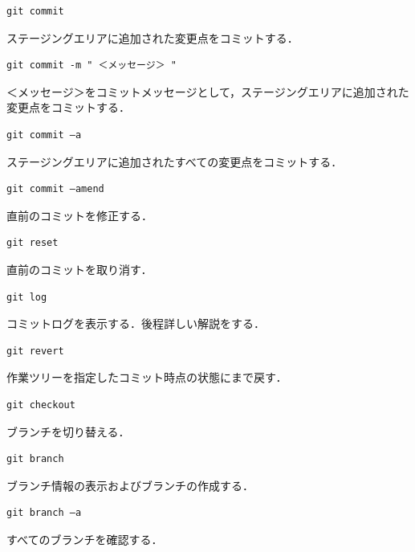 \hfil
\begin{lstlisting}[basicstyle=\ttfamily\footnotesize, frame=single]
git commit
\end{lstlisting}
ステージングエリアに追加された変更点をコミットする．

\begin{lstlisting}[basicstyle=\ttfamily\footnotesize, frame=single]
git commit -m " ＜メッセージ＞ "
\end{lstlisting}
＜メッセージ＞をコミットメッセージとして，ステージングエリアに追加された変更点をコミットする．

\begin{lstlisting}[basicstyle=\ttfamily\footnotesize, frame=single]
git commit –a
\end{lstlisting}
ステージングエリアに追加されたすべての変更点をコミットする．

\begin{lstlisting}[basicstyle=\ttfamily\footnotesize, frame=single]
git commit –amend
\end{lstlisting}
直前のコミットを修正する．

\hfil
\begin{lstlisting}[basicstyle=\ttfamily\footnotesize, frame=single]
git reset
\end{lstlisting}
直前のコミットを取り消す．

\hfil
\begin{lstlisting}[basicstyle=\ttfamily\footnotesize, frame=single]
git log
\end{lstlisting}
コミットログを表示する．後程詳しい解説をする．

\hfil
\begin{lstlisting}[basicstyle=\ttfamily\footnotesize, frame=single]
git revert
\end{lstlisting}
作業ツリーを指定したコミット時点の状態にまで戻す．

\hfil
\begin{lstlisting}[basicstyle=\ttfamily\footnotesize, frame=single]
git checkout
\end{lstlisting}
ブランチを切り替える．

\newpage

\begin{lstlisting}[basicstyle=\ttfamily\footnotesize, frame=single]
git branch
\end{lstlisting}
ブランチ情報の表示およびブランチの作成する．

\begin{lstlisting}[basicstyle=\ttfamily\footnotesize, frame=single]
git branch –a
\end{lstlisting}
すべてのブランチを確認する．


